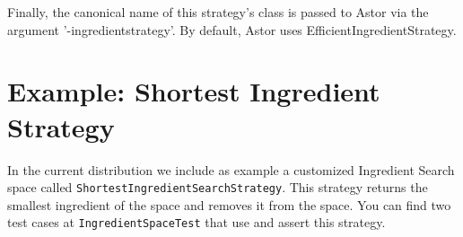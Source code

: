 \documentclass{article}
\begin{document}
Finally, the canonical name of this strategy's class is passed to Astor via the argument '-ingredientstrategy'. By default, Astor uses EfficientIngredientStrategy.

\section{Example: Shortest Ingredient Strategy}  
In the current distribution we include as example a customized Ingredient Search space called {\tt ShortestIngredientSearchStrategy}. 
This strategy returns the smallest ingredient of the space and removes it from the space.
You can find two test cases at {\tt IngredientSpaceTest} that use and assert this strategy.








\end{document}
